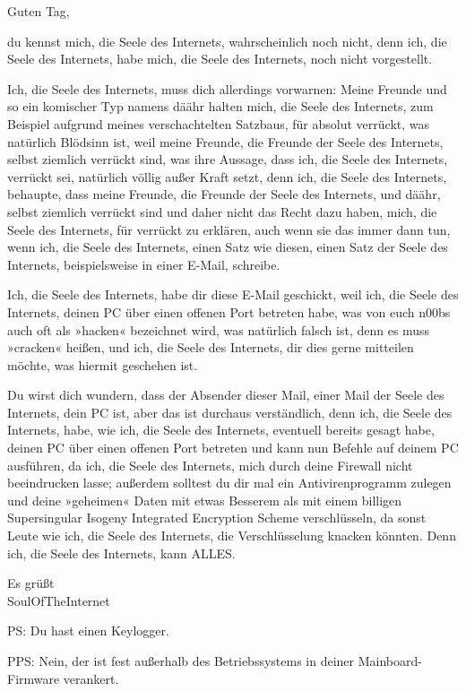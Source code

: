     \begin{itshape}

Guten Tag,

du kennst mich, die Seele des Internets, wahrscheinlich noch nicht, denn ich, die Seele des Internets, habe mich, die Seele des Internets, noch nicht vorgestellt.

Ich, die Seele des Internets, muss dich allerdings vorwarnen: Meine Freunde und so ein komischer Typ namens däähr halten mich, die Seele des Internets, zum Beispiel aufgrund meines verschachtelten Satzbaus, für absolut verrückt, was natürlich Blödsinn ist, weil meine Freunde, die Freunde der Seele des Internets, selbst ziemlich verrückt sind, was ihre Aussage, dass ich, die Seele des Internets, verrückt sei, natürlich völlig außer Kraft setzt, denn ich, die Seele des Internets, behaupte, dass meine Freunde, die Freunde der Seele des Internets, und däähr, selbst ziemlich verrückt sind und daher nicht das Recht dazu haben, mich, die Seele des Internets, für verrückt zu erklären, auch wenn sie das immer dann tun, wenn ich, die Seele des Internets, einen Satz wie diesen, einen Satz der Seele des Internets, beispielsweise in einer E-Mail, schreibe.

Ich, die Seele des Internets, habe dir diese E-Mail geschickt, weil ich, die Seele des Internets, deinen PC über einen offenen Port betreten habe, was von euch n00bs auch oft als »hacken« bezeichnet wird, was natürlich falsch ist, denn es muss »cracken« heißen, und ich, die Seele des Internets, dir dies gerne mitteilen möchte, was hiermit geschehen ist.

Du wirst dich wundern, dass der Absender dieser Mail, einer Mail der Seele des Internets, dein PC ist, aber das ist durchaus verständlich, denn ich, die Seele des Internets, habe, wie ich, die Seele des Internets, eventuell bereits gesagt habe, deinen PC über einen offenen Port betreten und kann nun Befehle auf deinem PC ausführen, da ich, die Seele des Internets, mich durch deine Firewall nicht beeindrucken lasse; außerdem solltest du dir mal ein Antivirenprogramm zulegen und deine »geheimen« Daten mit etwas Besserem als mit einem billigen Supersingular Isogeny Integrated Encryption Scheme verschlüsseln, da sonst Leute wie ich, die Seele des Internets, die Verschlüsselung knacken könnten. Denn ich, die Seele des Internets, kann ALLES.

Es grüßt\\
SoulOfTheInternet

PS: Du hast einen Keylogger.

PPS: Nein, der ist fest außerhalb des Betriebssystems in deiner Mainboard-Firmware verankert.

    \end{itshape}

